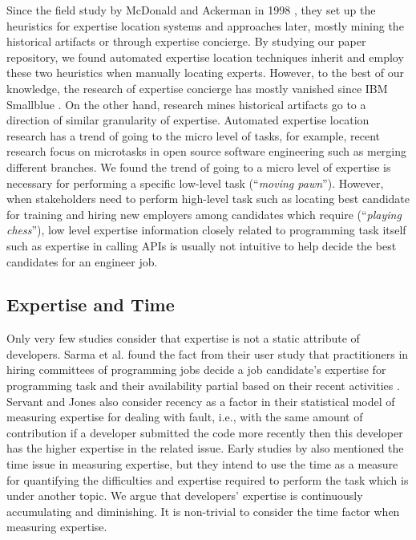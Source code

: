 Since the field study by McDonald and Ackerman in 1998 \cite{mcdonald1998just}, they set up the heuristics for expertise location systems and approaches later, mostly mining the historical artifacts or through expertise concierge. By studying our paper repository, we found automated expertise location techniques inherit and employ these two heuristics when manually locating experts. However, to the best of our knowledge, the research of expertise concierge has mostly vanished since IBM Smallblue \cite{lin2009smallblue}. On the other hand, research mines historical artifacts go to a direction of similar granularity of expertise. Automated expertise location research has a trend of going to the micro level of tasks, for example, recent research \cite{yu2016reviewer, costa2016tipmerge} focus on microtasks in open source software engineering such as merging different branches. We found the trend of going to a micro level of expertise is necessary for performing a specific low-level task (``\textit{moving pawn}''). However, when stakeholders need to perform high-level task such as locating best candidate for training and hiring new employers among candidates which require (``\textit{playing chess}''), low level expertise information closely related to programming task itself such as expertise in calling APIs is usually not intuitive to help decide the best candidates for an engineer job.

\subsection{Expertise and Time}

Only very few studies consider that expertise is not a static attribute of developers. Sarma et al. found the fact from their user study that practitioners in hiring committees of programming jobs decide a job candidate's expertise for programming task and their availability partial based on their recent activities \cite{hiring2016sarma}. Servant and Jones also consider recency as a factor in their statistical model of measuring expertise for dealing with fault, i.e., with the same amount of contribution if a developer submitted the code more recently then this developer has the higher expertise in the related issue. Early studies by \cite{mockus2002expertise} also mentioned the time issue in measuring expertise, but they intend to use the time as a measure for quantifying the difficulties and expertise required to perform the task which is under another topic. We argue that developers' expertise is continuously accumulating and diminishing. It is non-trivial to consider the time factor when measuring expertise.

